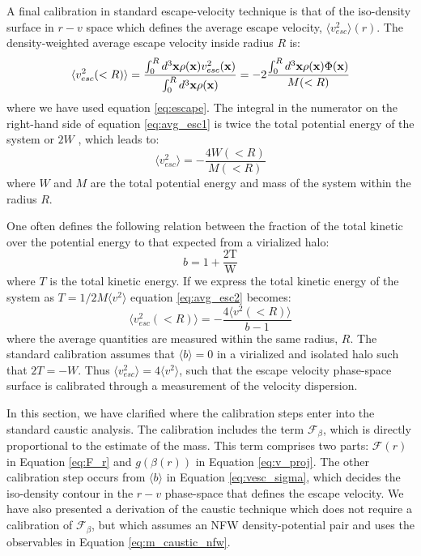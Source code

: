 \documentclass[iop]{emulateapj}
\begin{document}
        A final calibration in standard escape-velocity technique is that of the iso-density surface in $r-v$ space which defines the average escape velocity, $\langle v_{esc}^2\rangle (r)$. The density-weighted average escape velocity inside radius $R$ is:
        \begin{equation}
        \langle v^2_{esc}(<R) \rangle = \frac{\int_{0}^{R} d^3{\bf x} \rho({\bf x}) v_{esc}^2({\bf x})}{\int_{0}^{R} d^3{\bf x} \rho({\bf x})} = -2 \frac{\int_{0}^{R} d^3{\bf x} \rho({\bf x}) \Phi ({\bf x})}{M(<R)} 
        \label{eq:avg_esc1}
        \end{equation}
        where we have used equation \ref{eq:escape}. The integral in the numerator on the right-hand side of equation \ref{eq:avg_esc1} is twice the total potential energy of the system or $2W$ \citep{Binney87}, which leads to:
        \begin{equation}
        \langle v^2_{esc} \rangle = -\frac{4 W(<R)}{M(<R)}
        \label{eq:avg_esc2}
        \end{equation}
        where $W$ and $M$ are the total potential energy and mass of the system within the radius $R$. 
        
        One often defines the following relation between the fraction of the total kinetic over the potential energy to that expected from a virialized halo:
        \begin{equation}
        b = 1 + \frac{2\textrm{T}}{\textrm{W}}
        \label{eq:bind_frac}
        \end{equation}
        where $T$ is the total kinetic energy. If we express the total kinetic energy of the system as $T = 1/2 M \langle v^{2} \rangle$ equation \ref{eq:avg_esc2} becomes:
        \begin{equation}
        \langle v^2_{esc} (<R) \rangle = -\frac{4 \langle v^2 (<R) \rangle}{b-1}
        \label{eq:vesc_sigma}
       \end{equation}
        where the average quantities are measured within the same radius, $R$. The standard calibration assumes that  $\langle b \rangle = 0$ in a virialized and isolated halo such that $2T = -W$. Thus $\langle v_{esc}^2 \rangle = 4 \langle v^{2} \rangle$, such that the escape velocity phase-space surface is calibrated through a measurement of the velocity dispersion.
              
       In this section, we have clarified where the calibration steps enter into the standard caustic analysis. The calibration includes the term $\mathcal{F}_{\beta}$, which is directly proportional to the estimate of the mass. This term comprises two parts: $\mathcal{F}(r)$ in Equation \ref{eq:F_r} and $g(\beta(r))$ in Equation \ref{eq:v_proj}. The other calibration step occurs from $\langle b \rangle$ in Equation \ref{eq:vesc_sigma}, which decides the iso-density contour in the $r-v$ phase-space that defines the escape velocity. We have also presented a derivation of the caustic technique which does not require a calibration of  $\mathcal{F}_{\beta}$, but which assumes an NFW density-potential pair and uses the observables in Equation \ref{eq:m_caustic_nfw}.
       
\end{document}
